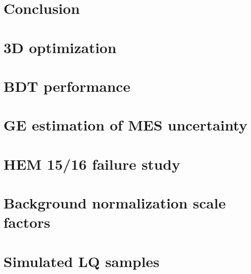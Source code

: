 \documentclass[thesis]{neu}
\begin{document}
\chapter{Conclusion} \label{chapter:Conclusion}



    
\clearpage
\appendix
\chapter{3D optimization} \label{app:3DOptimization}


\clearpage
\chapter{BDT performance} \label{app:BDTPerformance}


\clearpage
\chapter{GE estimation of MES uncertainty} \label{app:GEScaleSyst}


\clearpage
\chapter{HEM 15/16 failure study} \label{qpp:HEMFailure}


\clearpage
\chapter{Background normalization scale factors} \label{app:SFStudy}


\clearpage
\chapter{Simulated LQ samples} \label{app:SimLQSamples}

    
    
\end{document}
